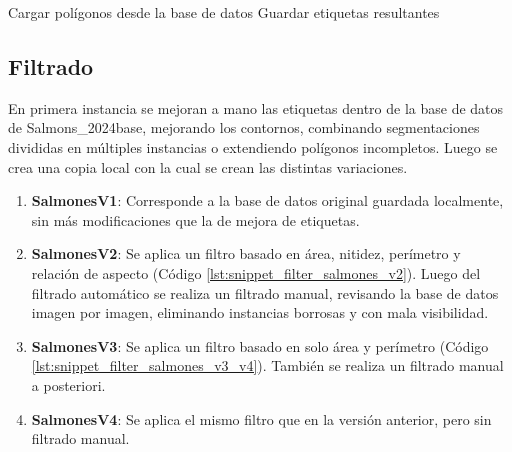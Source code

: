 \begin{algorithm}[H]
  \DontPrintSemicolon
  \SetAlgoLined
  Cargar polígonos desde la base de datos\;
  Guardar etiquetas resultantes\;
  \caption[Algoritmo para filtrado de base de datos]{Algoritmo para filtrado de base de datos.}
  \label{alg:filter_dataset}
\end{algorithm}

\subsection{Filtrado}
En primera instancia se mejoran a mano las etiquetas dentro de la base de datos de Salmons_2024base, mejorando los contornos, combinando segmentaciones divididas en múltiples instancias o extendiendo polígonos incompletos. Luego se crea una copia local con la cual se crean las distintas variaciones.

\begin{enumerate}%
  \setlength{\itemsep}{0pt}%
  \setlength{\parskip}{0pt}%
  \setlength{\parsep}{0pt}%
  \item \textbf{SalmonesV1}: Corresponde a la base de datos original guardada localmente, sin más modificaciones que la de mejora de etiquetas.
  \item \textbf{SalmonesV2}: Se aplica un filtro basado en área, nitidez, perímetro y relación de aspecto (Código \ref{lst:snippet_filter_salmones_v2}). Luego del filtrado automático se realiza un filtrado manual, revisando la base de datos imagen por imagen, eliminando instancias borrosas y con mala visibilidad.
  \item \textbf{SalmonesV3}: Se aplica un filtro basado en solo área y perímetro (Código \ref{lst:snippet_filter_salmones_v3_v4}). También se realiza un filtrado manual a posteriori.
  \item \textbf{SalmonesV4}: Se aplica el mismo filtro que en la versión anterior, pero sin filtrado manual.
\end{enumerate}

